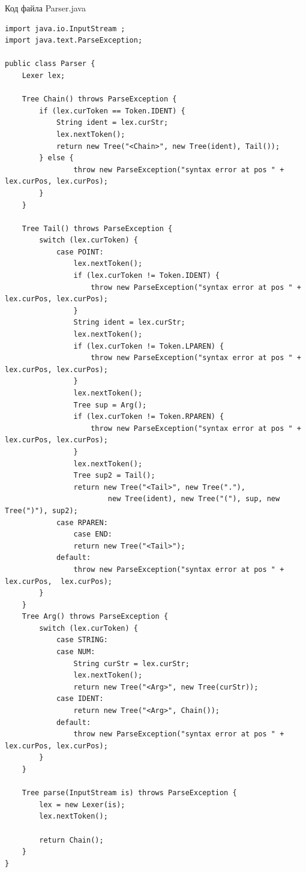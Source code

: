 \documentclass[a4paper, 14pt]{extarticle}
\begin{document}
\par
Код файла Parser.java
\begin{lstlisting}
import java.io.InputStream ;
import java.text.ParseException;

public class Parser {
    Lexer lex;

    Tree Chain() throws ParseException {
        if (lex.curToken == Token.IDENT) {
            String ident = lex.curStr;
            lex.nextToken();
            return new Tree("<Chain>", new Tree(ident), Tail());
        } else {
                throw new ParseException("syntax error at pos " + lex.curPos, lex.curPos);
        }
    }

    Tree Tail() throws ParseException {
        switch (lex.curToken) {
            case POINT:
                lex.nextToken();
                if (lex.curToken != Token.IDENT) {
                    throw new ParseException("syntax error at pos " + lex.curPos, lex.curPos);
                }
                String ident = lex.curStr;
                lex.nextToken();
                if (lex.curToken != Token.LPAREN) {
                    throw new ParseException("syntax error at pos " + lex.curPos, lex.curPos);
                }
                lex.nextToken();
                Tree sup = Arg();
                if (lex.curToken != Token.RPAREN) {
                    throw new ParseException("syntax error at pos " + lex.curPos, lex.curPos);
                }
                lex.nextToken();
                Tree sup2 = Tail();
                return new Tree("<Tail>", new Tree("."),
                        new Tree(ident), new Tree("("), sup, new Tree(")"), sup2);
            case RPAREN:
                case END:
                return new Tree("<Tail>");
            default:
                throw new ParseException("syntax error at pos " + lex.curPos,  lex.curPos);
        }
    }
    Tree Arg() throws ParseException {
        switch (lex.curToken) {
            case STRING:
            case NUM:
                String curStr = lex.curStr;
                lex.nextToken();
                return new Tree("<Arg>", new Tree(curStr));
            case IDENT:
                return new Tree("<Arg>", Chain());
            default:
                throw new ParseException("syntax error at pos " + lex.curPos, lex.curPos);
        }
    }

    Tree parse(InputStream is) throws ParseException {
        lex = new Lexer(is);
        lex.nextToken();

        return Chain();
    }
}
\end{lstlisting}
\end{document}
